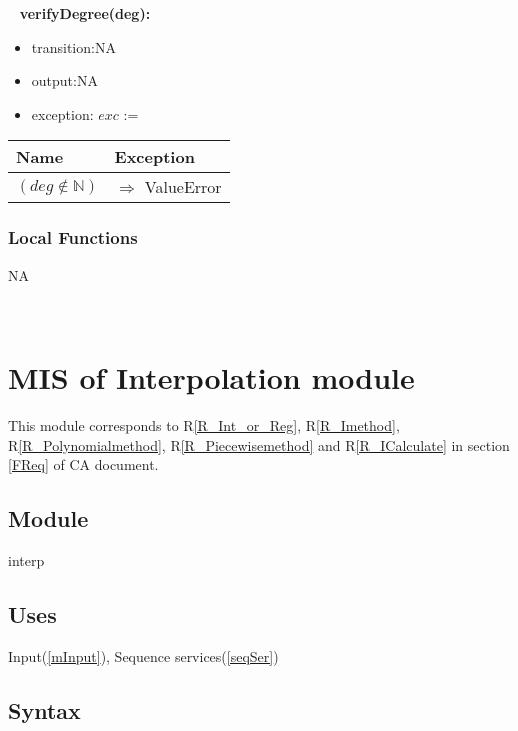 \documentclass[12pt, titlepage]{article}
\begin{document}
~\newline
\noindent \textbf{verifyDegree(deg):}
\begin{itemize}
	\item transition:NA
	\item output:NA 
	\item exception: $exc$ := 
\end{itemize}

\begin{tabular}{p{12cm} p{4.75cm}}
	
	\toprule
	\textbf{Name}&\textbf{Exception}\\
	\midrule
	
	
	$ (deg \notin \mathbb{N})$ & $\Longrightarrow$ ValueError\\

	
	\bottomrule
\end{tabular}


\subsubsection{Local Functions}

NA




~\newpage

\section{MIS of Interpolation module} \label{mInterp}

This module corresponds to R\ref{R_Int_or_Reg}, R\ref{R_Imethod}, 
R\ref{R_Polynomialmethod}, R\ref{R_Piecewisemethod} and R\ref{R_ICalculate}
in section \ref{FReq} of CA document.


\subsection{Module}

interp

\subsection{Uses}

Input(\ref{mInput}), Sequence services(\ref{seqSer})


\subsection{Syntax}
\end{document}

